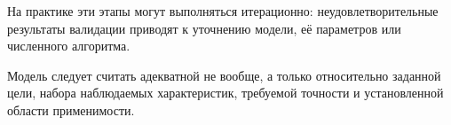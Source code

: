 На практике эти этапы могут выполняться итерационно: неудовлетворительные результаты валидации приводят к уточнению модели, её параметров или численного алгоритма.

Модель следует считать адекватной не вообще, а только относительно заданной цели, набора наблюдаемых характеристик, требуемой точности и установленной области применимости.

\newpage
